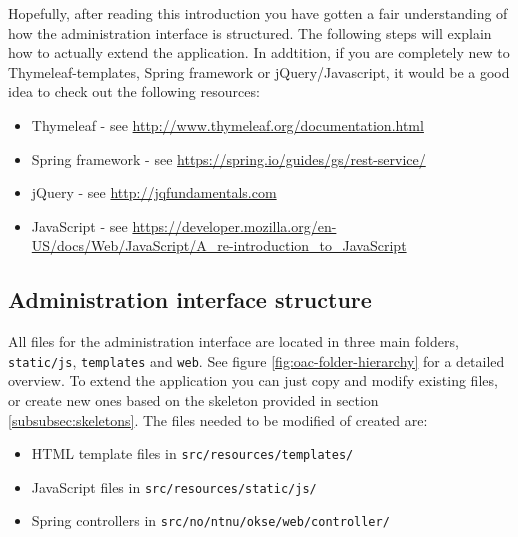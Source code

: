 Hopefully, after reading this introduction you have gotten a fair understanding of how the administration interface is structured. The following steps will explain how to actually extend the application. In addtition, if you are completely new to Thymeleaf-templates, Spring framework or jQuery/Javascript, it would be a good idea to check out the following resources: 

\begin{itemize}
\setlength{\itemsep}{0cm}%
\item Thymeleaf - see \url{http://www.thymeleaf.org/documentation.html}
\item Spring framework - see \url{https://spring.io/guides/gs/rest-service/}
\item jQuery - see \url{http://jqfundamentals.com}
\item JavaScript - see \url{https://developer.mozilla.org/en-US/docs/Web/JavaScript/A_re-introduction_to_JavaScript}
\end{itemize}

\subsection{Administration interface structure}

All files for the administration interface are located in three main folders, \verb!static/js!, \verb!templates! and \verb!web!. See figure \ref{fig:oac-folder-hierarchy} for a detailed overview. To extend the application you can just copy and modify existing files, or create new ones based on the skeleton provided in section \ref{subsubsec:skeletons}. The files needed to be modified of created are:

\begin{itemize}
\item HTML template files in \verb!src/resources/templates/!
\item JavaScript files in \verb!src/resources/static/js/!
\item Spring controllers in \verb!src/no/ntnu/okse/web/controller/! 
\end{itemize}

